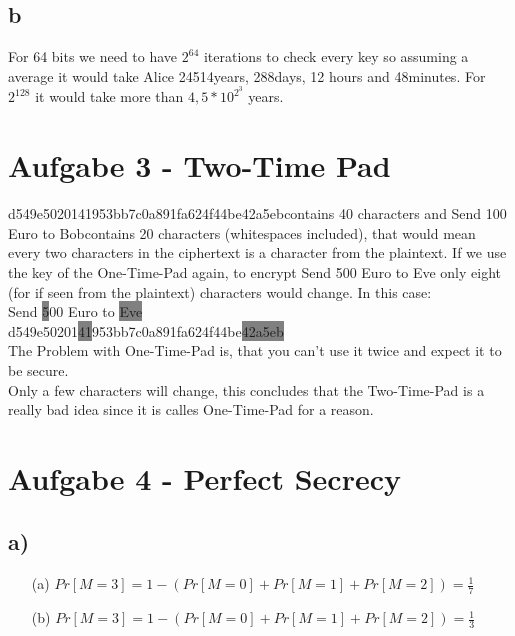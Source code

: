 \documentclass{article}
\theoremstyle{definition}
\theoremstyle{remark}
\begin{document}
\subsection*{b}
For 64 bits we need to have $2^{64}$ iterations to check every key so assuming a average it would take Alice 24514years, 288days, 12 hours and 48minutes. For $2^{128}$ it would take more than $4,5*10^2^3$ years.

\section*{Aufgabe 3 - Two-Time Pad}
\dq d549e5020141953bb7c0a891fa624f44be42a5eb\dq contains 40 characters and \dq Send 100 Euro to Bob\dq contains 20 characters (whitespaces included), that would mean every two characters in the ciphertext is a character from the plaintext. If we use the key of the One-Time-Pad again, to encrypt \dq Send 500 Euro to Eve \dq only eight (for if seen from the plaintext) characters would change. In this case: \\
Send \colorbox{gray}{5}00 Euro to \colorbox{gray}{Eve}\\
d549e50201\colorbox{gray}{41}953bb7c0a891fa624f44be\colorbox{gray}{42a5eb}\\[2mm]
The Problem with One-Time-Pad is, that you can’t use it twice and expect it to be secure.\\
Only a few characters will change, this concludes that the Two-Time-Pad is a really bad idea since it is calles One-Time-Pad for a reason.
\section*{Aufgabe 4 - Perfect Secrecy}
\subsection*{a)}
\begin{itemize}
    \item[(a)] $Pr[M=3] = 1 - (Pr[M=0] + Pr[M=1] + Pr[M=2]) = \frac{1}{7}$
    \item[(b)] $Pr[M=3] = 1 - (Pr[M=0] + Pr[M=1] + Pr[M=2]) = \frac{1}{3}$
\end{itemize}
\end{document}

